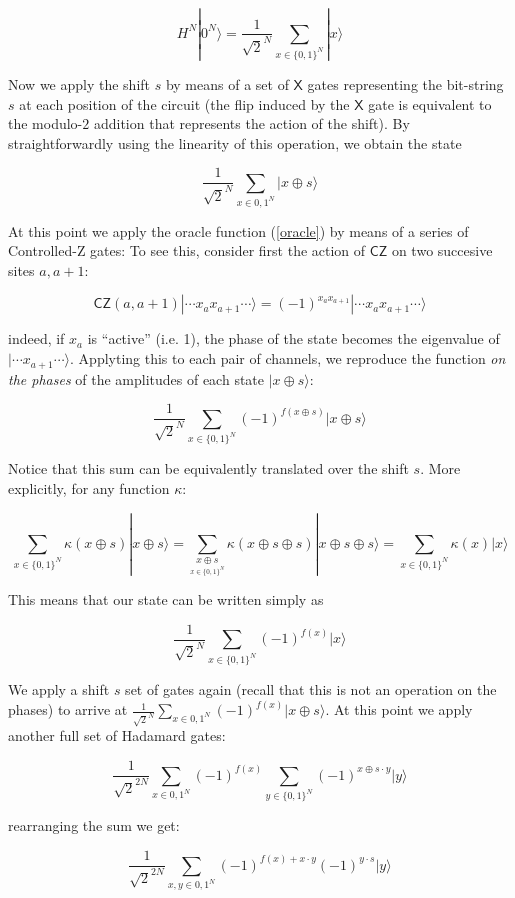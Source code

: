 \documentclass[letterpaper,onecolumn]{quantumarticle}
\begin{document}
$$H^N |0^N \rangle = \frac{1}{\sqrt{2}^N} \sum_{x\in \{0,1\}^N} |x\rangle$$

\noindent Now we apply the shift $s$ by means of a set of $\textsf{X}$ gates representing the bit-string $s$ at each position of the circuit (the flip induced by the $\textsf{X}$ gate is equivalent to the modulo-$2$ addition that represents the action of the shift). By straightforwardly using  the linearity of this operation, we obtain the state 

$$\frac{1}{\sqrt{2}^N} \sum_{x\in {0,1}^N} |x \oplus s\rangle$$

\noindent At this point we apply the oracle function (\ref{oracle}) by means of a series of \textsf{Controlled-Z} gates: To see this, consider first the action of $\textsf{CZ}$ on two succesive sites $a,a+1$:

$$
\textsf{CZ}(a,a+1) |\cdots x_a x_{a+1} \cdots \rangle= (-1)^{x_a x_{a+1}} |\cdots x_a x_{a+1} \cdots \rangle
$$

\noindent indeed, if $x_a$ is ``active'' (i.e. 1), the phase of the state becomes the eigenvalue of $| \cdots x_{a+1} \cdots \rangle$. Applyting this to each pair of channels, we reproduce the function \emph{on the phases} of the amplitudes of each state $|x \oplus s \rangle$:

$$\frac{1}{\sqrt{2}^N} \sum_{x\in \{0,1\}^N} (-1)^{f(x\oplus s)}|x \oplus s\rangle$$

\noindent Notice that this sum can be equivalently translated over the shift $s$. More explicitly, for any function $\kappa$:

$$\sum_{x\in \{0,1\}^N} \kappa(x\oplus s) |x \oplus s\rangle  =\sum_{\underset{x\in \{0,1\}^N}{x\oplus s}} \kappa(x\oplus s \oplus s) |x \oplus s \oplus s\rangle= \sum_{x\in \{0,1\}^N} \kappa(x)|x \rangle$$

This means that our state can be written simply as 

$$\frac{1}{\sqrt{2}^N} \sum_{x\in \{0,1\}^N} (-1)^{f(x)}|x \rangle$$

 We apply a shift $s$ set of gates again (recall that this is not an operation on the phases) to arrive at $\frac{1}{\sqrt{2}^N} \sum_{x\in {0,1}^N} (-1)^{f(x)}|x \oplus s\rangle$. At this point we apply another full set of Hadamard gates:
 
$$\frac{1}{\sqrt{2}^{2N}} \sum_{x\in {0,1}^N} (-1)^{f(x)} \sum_{y \in \{ 0,1 \}^N} (-1)^{x\oplus s\cdot y}|y \rangle $$
 
rearranging the sum we get:

$$\frac{1}{\sqrt{2}^{2N}} \sum_{x,y\in {0,1}^N}   (-1)^{f(x )+x\cdot y}(-1)^{y\cdot s}|y \rangle $$
\end{document}
